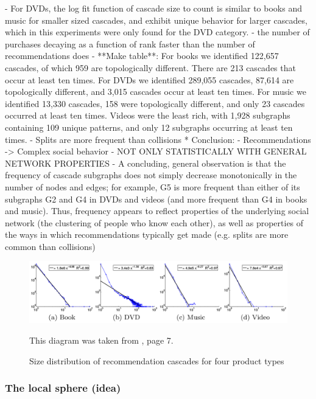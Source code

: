 	- For DVDs, the log fit function of cascade size to count is similar to books and music for smaller sized cascades, and exhibit unique behavior for larger cascades, which in this experiments were only found for the DVD category.
	- the number of purchases decaying as a function of rank faster than the number of recommendations does
	- **Make table**: For books we identified 122,657 cascades, of which 959 are topologically different. There are 213 cascades that occur at least ten times. For DVDs we identified 289,055 cascades, 87,614 are topologically different, and 3,015 cascades occur at least ten times. For music we identified 13,330 cascades, 158 were topologically different, and only 23 cascades occurred at least ten times. Videos were the least rich, with 1,928 subgraphs containing 109 unique patterns, and only 12 subgraphs occurring at least ten times.
	- Splits are more frequent than collisions
	* Conclusion:
	- Recommendations -> Complex social behavior
	- NOT ONLY STATISTICALLY WITH GENERAL NETWORK PROPERTIES
	- A concluding, general observation is that the frequency of cascade subgraphs does not simply decrease monotonically in the number of nodes and edges; for example, G5 is more frequent than either of its subgraphs G2 and G4 in DVDs and videos (and more frequent than G4 in books and music). Thus, frequency appears to reflect properties of the underlying social network (the clustering of people who know each other), as well as properties of the ways in which recommendations typically get made (e.g. splits are more common than collisions)
	
	\begin{figure}[ht]
		\label{fig_cascade_size_count}
		\begin{center}
			\includegraphics[width=1\textwidth]{figures/rec_cascades_size_count}
			\caption{Size distribution of recommendation cascades for four product types}
			\small
			This diagram was taken from \citep{RecCascades}, page 7.
		\end{center}
	\end{figure}
	
	
	\subsubsection{The local sphere (idea)}
	\label{sssect:the_local_sphere}
	

